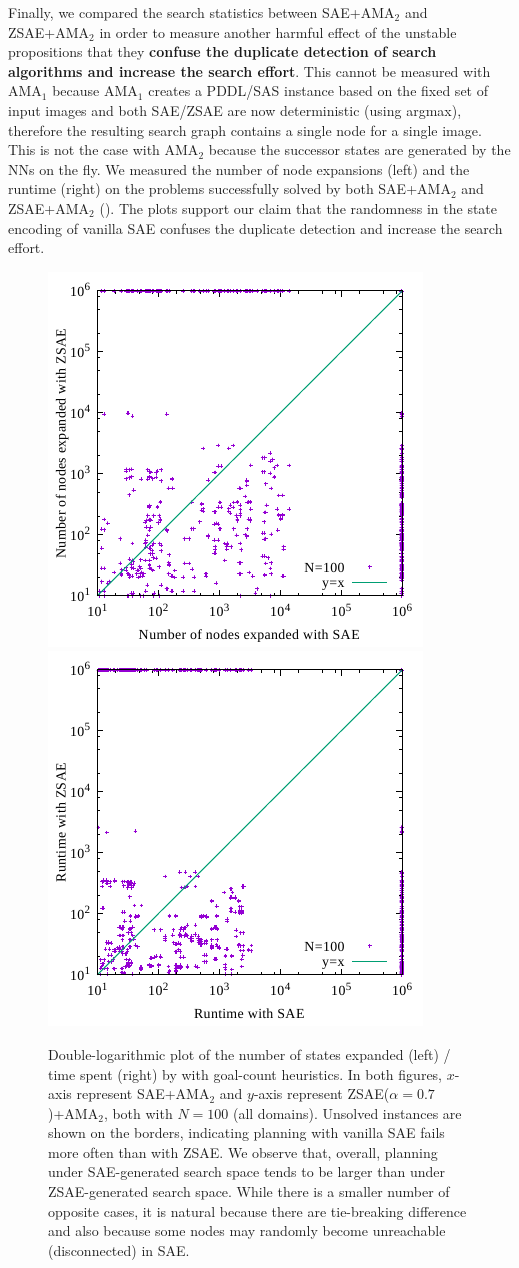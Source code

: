 Finally, we compared the search statistics between SAE+AMA$_2$ and ZSAE+AMA$_2$
in order to measure another harmful effect of the unstable propositions
that they \textbf{confuse the duplicate detection of search algorithms and increase the search effort}.
% 
This cannot be measured with AMA$_1$
because AMA$_1$ creates a PDDL/SAS instance based on the fixed set of
input images and both SAE/ZSAE are now deterministic (using argmax),
therefore the resulting search graph contains a single node for a single image.
This is not the case with AMA$_2$ because the successor states
are generated by the NNs on the fly.
% 
We measured the number of node expansions (left) and the runtime (right)
on the problems successfully solved by both SAE+AMA$_2$ and ZSAE+AMA$_2$ ().
The plots support our claim that
the randomness in the state encoding of vanilla SAE confuses the duplicate detection and
increase the search effort.

\begin{figure}[tb]
 \centering
 \includegraphics[width=0.4\linewidth]{img/static/exp.pdf}
 \includegraphics[width=0.4\linewidth]{img/static/time.pdf}
 \caption{Double-logarithmic plot of the number of states expanded (left) / time spent (right) by
\astar with goal-count heuristics.
In both figures,
$x$-axis represent SAE+AMA$_2$ and
$y$-axis represent ZSAE($\alpha=0.7$)+AMA$_2$, both with $N=100$ (all domains).
Unsolved instances are shown on the borders, indicating planning with vanilla SAE fails more often than with ZSAE.
We observe that, overall, planning under SAE-generated search space tends to be larger
than under ZSAE-generated search space.
While there is a smaller number of opposite cases, it is natural because
there are tie-breaking difference and also because some nodes may randomly become unreachable (disconnected) in SAE.
}
 \label{fig:ama2-statistics}
\end{figure}



